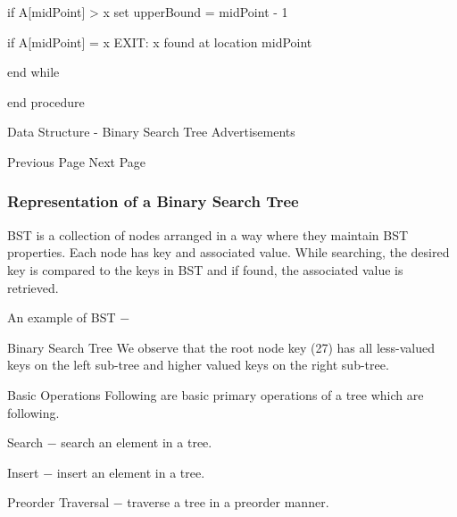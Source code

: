 \begin{frame}
\begin{frame}
      if A[midPoint] > x
         set upperBound = midPoint - 1 

      if A[midPoint] = x 
         EXIT: x found at location midPoint

   end while
   
end procedure
\end{frame}
\begin{frame}

Data Structure - Binary Search Tree
Advertisements

 
 Previous Page Next Page  
\end{frame}
\begin{frame}
\frametitle{Representation of a Binary Search Tree}
BST is a collection of nodes arranged in a way where they maintain BST properties. Each node has key and associated value. While searching, the desired key is compared to the keys in BST and if found, the associated value is retrieved.

An example of BST −
\end{frame}
\begin{frame}
Binary Search Tree
We observe that the root node key (27) has all less-valued keys on the left sub-tree and higher valued keys on the right sub-tree.

Basic Operations
Following are basic primary operations of a tree which are following.

Search − search an element in a tree.

Insert − insert an element in a tree.

Preorder Traversal − traverse a tree in a preorder manner.


\end{frame}
\end{frame}
